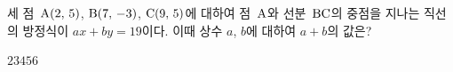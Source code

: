 세 점~$\mathrm{A}(2,\,5)$, $\mathrm{B}(7,\,-3)$, $\mathrm{C}(9,\,5)$에 대하여 점~$\mathrm{A}$와 선분~$\mathrm{BC}$의 중점을 지나는 직선의 방정식이 $ax+by=19$이다. 이때 상수 $a$, $b$에 대하여 $a+b$의 값은?
\begin{choices32}{$2$}{$3$}{$4$}{$5$}{$6$}\end{choices32}
